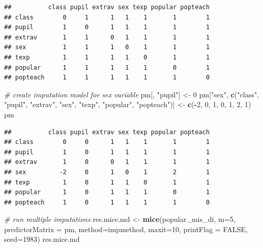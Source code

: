 \documentclass[
]{book}
\newenvironment{Shaded}{\begin{snugshade}}{\end{snugshade}}
\newcommand{\CommentTok}[1]{\textcolor[rgb]{0.56,0.35,0.01}{\textit{#1}}}
\newcommand{\DataTypeTok}[1]{\textcolor[rgb]{0.13,0.29,0.53}{#1}}
\newcommand{\DecValTok}[1]{\textcolor[rgb]{0.00,0.00,0.81}{#1}}
\newcommand{\KeywordTok}[1]{\textcolor[rgb]{0.13,0.29,0.53}{\textbf{#1}}}
\newcommand{\NormalTok}[1]{#1}
\newcommand{\OperatorTok}[1]{\textcolor[rgb]{0.81,0.36,0.00}{\textbf{#1}}}
\newcommand{\OtherTok}[1]{\textcolor[rgb]{0.56,0.35,0.01}{#1}}
\newcommand{\StringTok}[1]{\textcolor[rgb]{0.31,0.60,0.02}{#1}}
\begin{document}
\begin{verbatim}
##          class pupil extrav sex texp popular popteach
## class        0     1      1   1    1       1        1
## pupil        1     0      1   1    1       1        1
## extrav       1     1      0   1    1       1        1
## sex          1     1      1   0    1       1        1
## texp         1     1      1   1    0       1        1
## popular      1     1      1   1    1       0        1
## popteach     1     1      1   1    1       1        0
\end{verbatim}

\begin{Shaded}
\begin{Highlighting}[]
\CommentTok{# create imputation model for sex variable}
\NormalTok{pm[, }\StringTok{"pupil"}\NormalTok{] <-}\StringTok{ }\DecValTok{0}
\NormalTok{pm[}\StringTok{"sex"}\NormalTok{, }\KeywordTok{c}\NormalTok{(}\StringTok{"class"}\NormalTok{, }\StringTok{"pupil"}\NormalTok{, }\StringTok{"extrav"}\NormalTok{, }\StringTok{"sex"}\NormalTok{, }\StringTok{"texp"}\NormalTok{, }\StringTok{"popular"}\NormalTok{, }\StringTok{"popteach"}\NormalTok{)] <-}\StringTok{ }\KeywordTok{c}\NormalTok{(}\OperatorTok{-}\DecValTok{2}\NormalTok{, }\DecValTok{0}\NormalTok{, }\DecValTok{1}\NormalTok{, }\DecValTok{0}\NormalTok{, }\DecValTok{1}\NormalTok{, }\DecValTok{2}\NormalTok{, }\DecValTok{1}\NormalTok{)}
\NormalTok{pm}
\end{Highlighting}
\end{Shaded}

\begin{verbatim}
##          class pupil extrav sex texp popular popteach
## class        0     0      1   1    1       1        1
## pupil        1     0      1   1    1       1        1
## extrav       1     0      0   1    1       1        1
## sex         -2     0      1   0    1       2        1
## texp         1     0      1   1    0       1        1
## popular      1     0      1   1    1       0        1
## popteach     1     0      1   1    1       1        0
\end{verbatim}

\begin{Shaded}
\begin{Highlighting}[]
\CommentTok{# run multiple imputations}
\NormalTok{res.mice.md <-}\StringTok{ }\KeywordTok{mice}\NormalTok{(popular_mis_di, }\DataTypeTok{m=}\DecValTok{5}\NormalTok{, }\DataTypeTok{predictorMatrix =}\NormalTok{ pm,}
                    \DataTypeTok{method=}\NormalTok{impmethod, }\DataTypeTok{maxit=}\DecValTok{10}\NormalTok{, }\DataTypeTok{printFlag =} \OtherTok{FALSE}\NormalTok{, }\DataTypeTok{seed=}\DecValTok{1983}\NormalTok{)}
\NormalTok{res.mice.md}
\end{Highlighting}
\end{Shaded}
\end{document}
